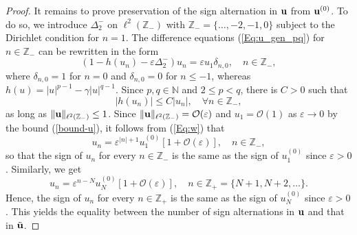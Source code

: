 \documentclass[10pt,a4paper]{amsart}
\begin{document}
\begin{proof}
It remains to prove preservation of the sign alternation in ${\bf u}$ from ${\bf u}^{(0)}$. To do so, we introduce $\Delta_2^-$ on $\ell^2(\mathbb{Z}_-)$ 
with $\mathbb{Z}_- = \{ \dots, -2,-1,0\}$ subject to the Dirichlet condition for $n = 1$. The difference equations (\ref{Eq:u_gen_pq}) for $n \in \mathbb{Z}_-$ can be rewritten in the form 
\begin{equation}
(1 - h(u_n) - \varepsilon \Delta_2^-) u_n = \varepsilon u_1 \delta_{n,0}, \quad n \in \mathbb{Z}_-,
\label{Eq:w}
\end{equation}
where $\delta_{n,0} = 1$ for $n = 0$ and $\delta_{n,0} = 0$ for $n \leq -1$, whereas $h(u) = |u|^{p-1} - \gamma |u|^{q-1}$. Since $p,q \in \mathbb{N}$ and $2 \leq p < q$, there is $C > 0$ such that 
$$
|h(u_n)| \leq C |u_n|, \quad \forall n \in \mathbb{Z}_-,
$$
as long as $\|{\bf u} \|_{\ell^2(\mathbb{Z}_-)} \leq 1$. Since $\|{\bf u} \|_{\ell^2(\mathbb{Z}_-)} = \mathcal{O}(\varepsilon)$ and $u_1 = \mathcal{O}(1)$ as $\varepsilon \to 0$ by the bound (\ref{bound-u}), it follows from (\ref{Eq:w}) that 
$$
u_n = \varepsilon^{|n|+1} u_1^{(0)} \left[ 1 + \mathcal{O}(\varepsilon) \right], \quad n \in \mathbb{Z}_-,
$$
so that the sign of $u_n$ for every $n \in \mathbb{Z}_-$ is the same as the sign of $u_1^{(0)}$ since $\varepsilon > 0$. Similarly, we get 
$$
u_n = \varepsilon^{n-N} u_N^{(0)} \left[ 1 + \mathcal{O}(\varepsilon) \right], \quad n \in \mathbb{Z}_+ = \{ N+1,N+2,\dots\}.
$$
Hence, the sign of $u_n$ for every $n \in \mathbb{Z}_+$ is the same as the sign of $u_N^{(0)}$ since $\varepsilon > 0$. This yields the equality between the number of sign alternations in ${\bf u}$ and that in $\tilde{\bf u}$.
\end{proof}
\end{document}
